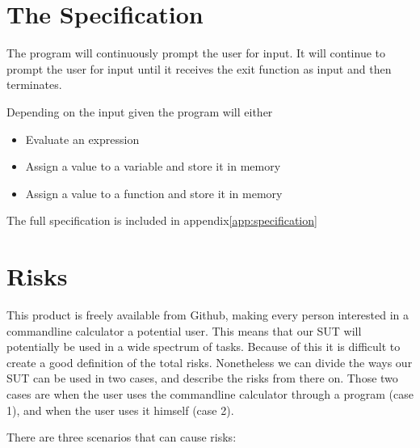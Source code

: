 \documentclass[11pt,a4paper]{article}
\begin{document}

\section{The Specification}


The program will continuously prompt the user for input. It will
continue to prompt the user for input until it receives the exit
function as input and then terminates.

Depending on the input given the program will either

\begin{itemize}
\item Evaluate an expression
\item Assign a value to a variable and store it in memory
\item Assign a value to a function and store it in memory
\end{itemize}
The full specification is included in appendix\ref{app:specification}

\section{Risks}
This product is freely available from Github, making every person interested in a commandline calculator a potential user. This means that our SUT will potentially be used in a wide spectrum of tasks. Because of this it is difficult to create a good definition of the total risks. Nonetheless we can divide the ways our SUT can be used in two cases, and describe the risks from there on. Those two cases are when the user uses the commandline calculator through a program (case 1), and when the user uses it himself (case 2).

There are three scenarios that can cause risks:

\end{document}
